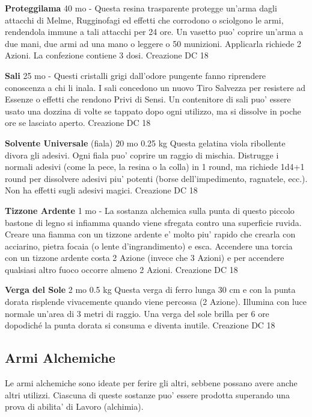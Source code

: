 \documentclass[a4paper,11pt,twoside,openany]{dndbook}
\begin{document}
{\textbf{Proteggilama} 40 mo - Questa resina trasparente protegge un'arma dagli attacchi di Melme, Rugginofagi ed effetti che corrodono o sciolgono le armi, rendendola immune a tali attacchi per 24 ore. Un vasetto puo' coprire un'arma a due mani, due armi ad una mano o leggere o 50 munizioni. Applicarla richiede 2 Azioni. La confezione contiene 3 dosi. Creazione DC 18

\textbf{Sali} 25 mo - Questi cristalli grigi dall'odore pungente fanno riprendere conoscenza a chi li inala. I sali concedono un nuovo Tiro Salvezza per resistere ad Essenze o effetti che rendono Privi di Sensi.
Un contenitore di sali puo' essere usato una dozzina di volte se tappato dopo ogni utilizzo, ma si dissolve in poche ore se lasciato aperto. Creazione DC 18

\textbf{Solvente Universale} (fiala) 20 mo 0.25 kg Questa gelatina viola ribollente divora gli adesivi. Ogni fiala puo' coprire un raggio di mischia. Distrugge i normali adesivi (come la pece, la resina o la colla) in 1 round, ma richiede 1d4+1 round per dissolvere adesivi piu' potenti (borse dell'impedimento, ragnatele, ecc.). Non ha effetti sugli adesivi magici. Creazione DC 18

\textbf{Tizzone Ardente} 1 mo - La sostanza alchemica sulla punta di questo piccolo bastone di legno si infiamma quando viene sfregata contro una superficie ruvida. Creare una fiamma con un tizzone ardente e' molto piu' rapido che crearla con acciarino, pietra focaia (o lente d'ingrandimento) e esca. Accendere una torcia con un tizzone ardente costa 2 Azione (invece che 3 Azioni) e per accendere qualsiasi altro fuoco occorre almeno 2 Azioni. Creazione DC 18

\textbf{Verga del Sole} 2 mo 0.5 kg Questa verga di ferro lunga 30 cm e con la punta dorata risplende vivacemente quando viene percossa (2 Azione). Illumina con luce normale un'area di 3 metri di raggio. Una verga del sole brilla per 6 ore dopodiché la punta dorata si consuma e diventa inutile. Creazione DC 18

\pagebreak

\subsection{Armi Alchemiche}

\label{armi-alchemiche}

Le armi alchemiche sono ideate per ferire gli altri, sebbene possano avere anche altri utilizzi. Ciascuna di queste sostanze puo' essere prodotta superando una prova di abilita' di Lavoro (alchimia).

}
\end{document}
